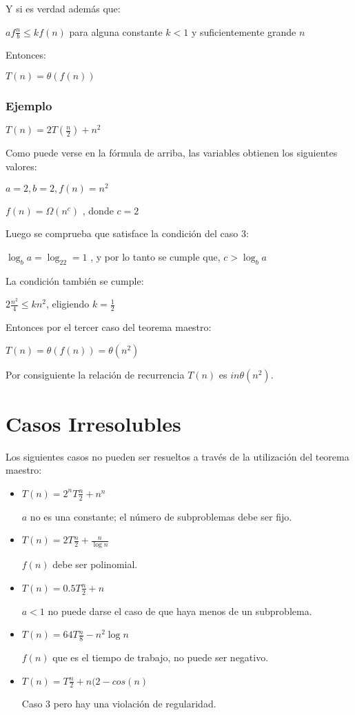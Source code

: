 \documentclass[12pt]{article} %
\begin{document}
Y si es verdad además que:

$af \frac{n}{b} \leq k f(n)$ para alguna constante $k<1$ y suficientemente grande $n$

Entonces:

$T(n)=\theta(f(n))$

\subsubsection{Ejemplo}
$T(n)=2T(\frac{n}{2}) +n^2$

Como puede verse en la fórmula de arriba, las variables obtienen los siguientes valores:

$a=2, b=2, f(n)=n^2$

$f(n) = \Omega (n^c)$ , donde $c=2$

Luego se comprueba que satisface la condición del caso 3:

$\log_ba = \log_22 =1$ , y por lo tanto se cumple que, $c>\log_ba$

La condición también se cumple:

$2 \frac{n^2}{4} \leq k n^2$, eligiendo $k=\frac{1}{2}$

Entonces por el tercer caso del teorema maestro:

$T(n) = \theta (f(n)) = \theta (n^2)$

Por consiguiente la relación de recurrencia $T(n)$ es $in \theta(n^2)$.
\section{Casos Irresolubles}
Los siguientes casos no pueden ser resueltos a través de la utilización del teorema maestro: \parencite{MIT}

\begin{itemize}
\item $T(n)= 2^{n} T \frac{n}{2} + n^n $

$a$ no es una constante; el número de subproblemas debe ser fijo.

\item $T(n)= 2 T \frac{n}{2} + \frac{n}{\log n} $ 

$f(n)$ debe ser polinomial.

\item $T(n)= 0.5 T \frac{n}{2} + n $ 

$a<1$ no puede darse el caso de que haya menos de un subproblema.

\item $T(n)= 64 T \frac{n}{8} - n^2 \log n $ 

$f(n)$ que es el tiempo de trabajo, no puede ser negativo.

\item $T(n)= T \frac{n}{2} + n(2-cos(n) $ 

Caso 3 pero hay una violación de regularidad.

\end{itemize}
\end{document}
